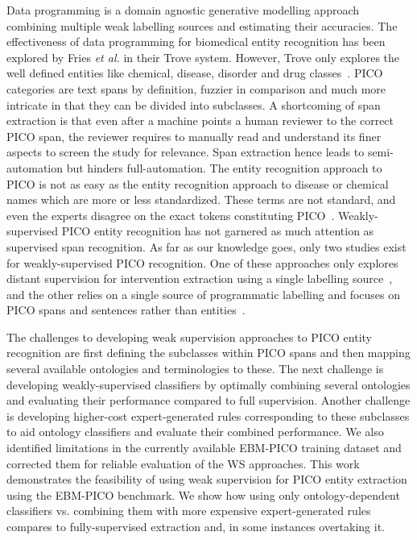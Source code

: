 \documentclass[10.7pt,]{article}
\begin{document}
Data programming is a domain agnostic generative modelling approach combining multiple weak labelling sources and estimating their accuracies.
The effectiveness of data programming for biomedical entity recognition has been explored by Fries \textit{et al.} in their Trove system.
However, Trove only explores the well defined entities like chemical, disease, disorder and drug classes~\cite{fries2021ontology}. 
PICO categories are text spans by definition, fuzzier in comparison and much more intricate in that they can be divided into subclasses.
A shortcoming of span extraction is that even after a machine points a human reviewer to the correct PICO span, the reviewer requires to manually read and understand its finer aspects to screen the study for relevance.
Span extraction hence leads to semi-automation but hinders full-automation.
The entity recognition approach to PICO is not as easy as the entity recognition approach to disease or chemical names which are more or less standardized.
These terms are not standard, and even the experts disagree on the exact tokens constituting PICO~\cite{brockmeier2019improving}.
Weakly-supervised PICO entity recognition has not garnered as much attention as supervised span recognition.
As far as our knowledge goes, only two studies exist for weakly-supervised PICO recognition.
One of these approaches only explores distant supervision for intervention extraction using a single labelling source~\cite{dhrangadhariya2022distant}, and the other relies on a single source of programmatic labelling and focuses on PICO spans and sentences rather than entities~\cite{liu2021sent2span}.

The challenges to developing weak supervision approaches to PICO entity recognition are first defining the subclasses within PICO spans and then mapping several available ontologies and terminologies to these.
The next challenge is developing weakly-supervised classifiers by optimally combining several ontologies and evaluating their performance compared to full supervision.
Another challenge is developing higher-cost expert-generated rules corresponding to these subclasses to aid ontology classifiers and evaluate their combined performance.
We also identified limitations in the currently available EBM-PICO training dataset and corrected them for reliable evaluation of the WS approaches.
This work demonstrates the feasibility of using weak supervision for PICO entity extraction using the EBM-PICO benchmark.
We show how using only ontology-dependent classifiers vs. combining them with more expensive expert-generated rules compares to fully-supervised extraction and, in some instances overtaking it.
%
\end{document}

